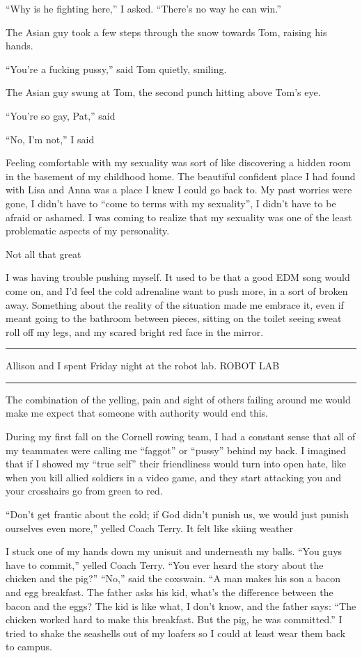 ``Why is he fighting here,'' I asked.  ``There's no way he can win.'' 

The Asian guy took a few steps through the snow towards Tom, raising his hands.

``You're a fucking pussy,'' said Tom quietly, smiling. 

The Asian guy swung at Tom, the second punch hitting above Tom's eye.

``You're so gay, Pat,'' said 

``No, I'm not,'' I said

Feeling comfortable with my sexuality was sort of like discovering a hidden room
in the basement of my childhood home.  The beautiful confident place I had found
with Lisa and Anna was a place I knew I could go back to.  My past worries were
gone, I didn't have to ``come to terms with my sexuality'', I didn't have to be
afraid or ashamed.  I was coming to realize that my sexuality was one of the
least problematic aspects of my personality.
 
Not all that great

I was having trouble pushing myself.  It used to be that a good EDM song would
come on, and I'd feel the cold adrenaline want to push more, in a sort of broken
away.  Something about the reality of the situation made me embrace it, even if
meant going to the bathroom between pieces, sitting on the toilet seeing sweat
roll off my legs, and my scared bright red face in the mirror.  


\plainfancybreak{12pt}{2}{* * *}

Allison and I spent Friday night at the robot lab.
ROBOT LAB

\plainfancybreak{12pt}{2}{* * *}

The combination of the yelling, pain and sight of others failing around me would
make me expect that someone with authority would end this.

During my first fall on the Cornell rowing team, I had a constant sense that
all of my teammates were calling me ``faggot'' or ``pussy'' behind my back.  I
imagined that if I showed my ``true self'' their friendliness would turn into
open hate, like when you kill allied soldiers in a video game, and they start
attacking you and your crosshairs go from green to red.  

``Don't get frantic about the cold; if God didn't punish us, we would just
punish ourselves even more,'' yelled Coach Terry.  It felt like skiing weather

I stuck one of my hands down my unisuit and underneath my balls.  ``You guys
have to commit,'' yelled Coach Terry.  ``You ever heard the story about the
chicken and the pig?'' ``No,'' said the coxswain.  ``A man makes his son a bacon
and egg breakfast.  The father asks his kid, what's the difference between the
bacon and the eggs?  The kid is like what, I don't know, and the father says:
``The chicken worked hard to make this breakfast.  But the pig, he was
committed.'' I tried to shake the seashells out of my loafers so I could at
least wear them back to campus. 

